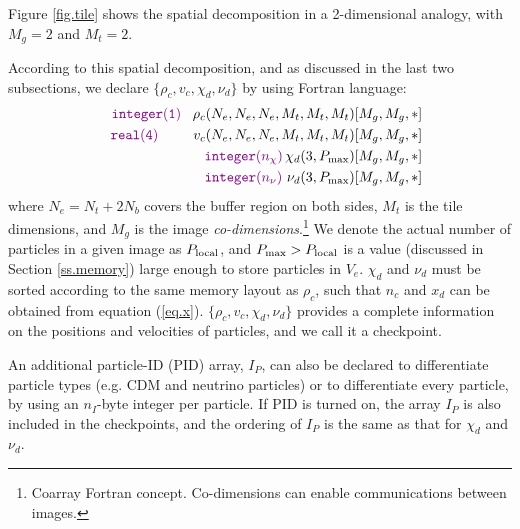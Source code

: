 \documentclass[10pt,twocolumn,preprint]{emulateapj}
\newcommand{\bs}{\boldsymbol}
\newcommand{\tcv}{\textcolor{violet}}
\begin{document}
Figure \ref{fig.tile} shows the spatial decomposition in a 2-dimensional analogy, with $M_g=2$ and $M_t=2$.

According to this spatial decomposition, and as discussed in the last two subsections, we declare $\{\rho_c,v_c,\chi_d,\nu_d\}$ by using Fortran language:
\begin{eqnarray*}
	&&\tcv{{\tt integer(1)}}\ \ \, \rho_c(N_e,N_e,N_e,M_t,M_t,M_t)[M_g,M_g,*]\\
	&&\tcv{{\tt real(4)}}\ \ \ \ \ \ \ \, v_c(N_e,N_e,N_e,M_t,M_t,M_t)[M_g,M_g,*]\\
	&&\tcv{{\tt integer(}n_\chi{\tt )}}\, \chi_d(3,P_{\rm max})[M_g,M_g,*]\\
	&&\tcv{{\tt integer(}n_\nu{\tt )}}\ \nu_d(3,P_{\rm max})[M_g,M_g,*]
\end{eqnarray*}
where $N_e=N_t+2N_b$ covers the buffer region on both sides, $M_t$ is the tile dimensions, and $M_g$ is the image {\it co-dimensions}.\footnote{Coarray Fortran concept. Co-dimensions can enable communications between images.} We denote the actual number of particles in a given image as $P_{\rm local}$, and $P_{\rm max}>P_{\rm local}$ is a value (discussed in Section \ref{ss.memory}) large enough to store particles in $V_e$. $\chi_d$ and $\nu_d$
must be sorted according to the same memory layout as $\rho_c$, such that $n_c$ and $x_d$ can be obtained from equation (\ref{eq.x}).
$\{\rho_c,v_c,\chi_d,\nu_d\}$ provides a complete information on the positions and velocities of particles, and we call it a checkpoint.

An additional particle-ID (PID) array, $I_P$, can also be declared to differentiate particle types (e.g. CDM and neutrino particles) or to differentiate every particle, by using an $n_I$-byte integer per particle. If PID is turned on, the array $I_P$ is also included in the checkpoints, and the ordering of $I_P$ is the same as that for $\chi_d$ and $\nu_d$.
\end{document}
